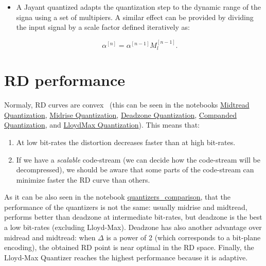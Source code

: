 \begin{itemize}
\item
  A Jayant quantized adapts the quantization step to the dynamic range
  of the signa using a set of multipiers. A similar effect can be
  provided by dividing the input signal by a scale factor defined
  iteratively as:

  \begin{equation}
    \alpha^{[n]} = \alpha^{[n-1]}M_l^{[n-1]}.
  \end{equation}
\end{itemize}


\section{RD performance}

Normaly, RD curves are convex~\cite{vruiz__information_theory} (this
can be seen in the notebooks
\href{https://github.com/vicente-gonzalez-ruiz/scalar_quantization/blob/master/docs/graphics/midtread.ipynb}{Midtread Quantization},
\href{https://github.com/vicente-gonzalez-ruiz/scalar_quantization/blob/master/docs/graphics/midrise.ipynb}{Midrise Quantization},
\href{https://github.com/vicente-gonzalez-ruiz/scalar_quantization/blob/master/docs/graphics/deadzone.ipynb}{Deadzone Quantization},
\href{https://github.com/vicente-gonzalez-ruiz/scalar_quantization/blob/master/docs/graphics/companded_quantization.ipynb}{Companded Quantization},
and
\href{https://github.com/vicente-gonzalez-ruiz/scalar_quantization/blob/master/docs/LloydMax_quantization.ipynb}{LloydMax Quantization}). This means that:
\begin{enumerate}
\item At low bit-rates the distortion decreases faster than at high
  bit-rates.
\item If we have a \emph{scalable} code-stream (we can decide how the
  code-stream will be decompressed), we should be aware that some
  parts of the code-stream can minimize faster the RD curve than
  others.
\end{enumerate}

As it can be also seen in the notebook
\href{https://github.com/vicente-gonzalez-ruiz/scalar_quantization/blob/master/docs/compare_quantizers.ipynb}{quantizers\_comparison},
that the performance of the quantizers is not the same: usually
midrise and midtread, performs better than deadzone at intermediate
bit-rates, but deadzone is the best a low bit-rates (excluding
Lloyd-Max). Deadzone has also another advantage over midread and
midtread: when $\Delta$ is a power of 2 (which corresponds to a
bit-plane encoding), the obtained RD point is near optimal in the RD
space. Finally, the Lloyd-Max Quantizer reaches the highest
performance because it is adaptive.

